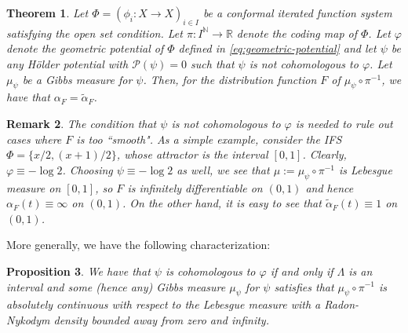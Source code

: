 \documentclass[11pt]{amsart}
\newcommand\NN{\mathbb{N}}
\newcommand\RR{\mathbb{R}}
\newcommand\pressure{\mathcal{P}}
\newcommand{\1}{1}
\newtheorem{theorem}{Theorem}[section]
\newtheorem{remark}[theorem]{Remark}
\newtheorem{proposition}[theorem]{Proposition}
\begin{document}
\begin{theorem} \label{thm:main}
Let $\Phi=(\phi_{i}:X\rightarrow X)_{i\in I}$ be a conformal iterated
function system satisfying the open set condition. Let $\pi:I^\NN\to\RR$ denote the coding map of $\Phi$. 
Let $\varphi$ denote the geometric potential of $\Phi$ defined in \eqref{eq:geometric-potential}  and let $\psi$ be any H\"older potential with $\pressure(\psi)=0$ such that $\psi$ is not cohomologous to $\varphi$.  Let $\mu_\psi$ be a Gibbs measure for $\psi$. Then, for the distribution function $F$ of $\mu_\psi\circ\pi^{-1}$, we have that $\alpha_F=\tilde{\alpha}_F$. 
\end{theorem}

\begin{remark}
{\rm
The condition that $\psi$ is not cohomologous to $\varphi$ is needed to rule out cases where $F$ is too ``smooth".
As a simple example, consider the IFS $\Phi=\{x/2,(x+1)/2\}$, whose attractor is the interval $[0,1]$. Clearly, $\varphi\equiv -\log 2$. Choosing $\psi\equiv -\log 2$ as well, we see that $\mu:=\mu_\psi\circ\pi^{-1}$ is Lebesgue measure on $[0,1]$, so $F$ is infinitely differentiable on $(0,1)$ and hence $\alpha_F(t)\equiv \infty$ on $(0,1)$. On the other hand, it is easy to see that $\tilde{\alpha}_F(t)\equiv 1$ on $(0,1)$.
}
\end{remark}

More generally, we have the following characterization:

\begin{proposition} \label{prop:when-cohomologous}
 We have that $\psi$ is cohomologous to $\varphi$ if and only if $\Lambda$ is an interval and some (hence any) Gibbs measure $\mu_\psi$ for $\psi$ satisfies that $\mu_\psi \circ \pi^{-1}$ is  absolutely continuous with respect to the Lebesgue measure with a Radon-Nykodym density bounded away from zero and infinity.
\end{proposition}
\end{document}
